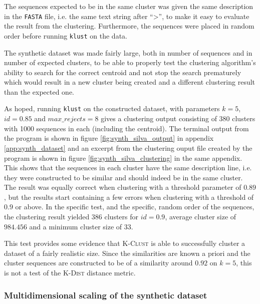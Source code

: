 The sequences expected to be in the same cluster was given the same description
in the \texttt{FASTA} file, i.e. the same text string after ``>'', to make it
easy to evaluate the result from the clustering. Furthermore, the sequences
were placed in random order before running \texttt{klust} on the data.

The synthetic dataset was made fairly large, both in number of sequences and in
number of expected clusters, to be able to properly test the clustering
algorithm's ability to search for the correct centroid and not stop the search
prematurely which would result in a new cluster being created and a different
clustering result than the expected one.

As hoped, running \texttt{klust} on the constructed dataset, with parameters
$k=5$, $id=0.85$ and $max\_rejects=8$ gives a clustering output consisting of
380 clusters with 1000 sequences in each (including the centroid). The terminal
output from the program is shown in figure \ref{fig:synth_silva_output} in
appendix \ref{app:synth_dataset} and an excerpt from the clustering ouput file
created by the program is shown in figure \ref{fig:synth_silva_clustering} in
the same appendix. This shows that the sequences in each cluster have the same
description line, i.e. they were constructed to be similar and should indeed be
in the same cluster. The result was equally correct when clustering with a
threshold parameter of $0.89$, but the results start containing a few errors
when clustering with a threshold of $0.9$ or above. In the specific test, and
the specific, random order of the sequences, the clustering result yielded 386
clusters for $id=0.9$, average cluster size of $984.456$ and a minimum cluster
size of $33$.


This test provides some evidence that \textsc{K-Clust} is able to successfully
cluster a dataset of a fairly realistic size. Since the similarities are known
a priori and the cluster sequences are constructed to be of a similarity around
$0.92$ on $k=5$, this is not a test of the \textsc{K-Dist} distance metric.


\subsubsection{Multidimensional scaling of the synthetic dataset}
\label{sec:mds_synth}

